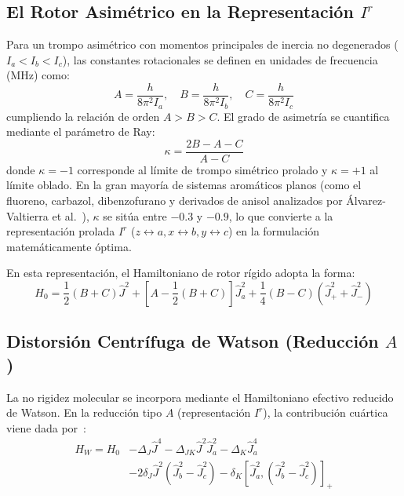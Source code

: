\documentclass[aps,jcp,reprint,twocolumn,superscriptaddress,showpacs,amsmath,amssymb]{revtex4-2}
\begin{document}
\subsection{El Rotor Asim\'etrico en la Representaci\'on $I^r$}
Para un trompo asim\'etrico con momentos principales de inercia no degenerados ($I_a < I_b < I_c$), las constantes rotacionales se definen en unidades de frecuencia (MHz) como:
\begin{equation}
A = \frac{h}{8\pi^2 I_a}, \quad B = \frac{h}{8\pi^2 I_b}, \quad C = \frac{h}{8\pi^2 I_c}
\end{equation}
cumpliendo la relaci\'on de orden $A > B > C$. El grado de asimetr\'ia se cuantifica mediante el par\'ametro de Ray:
\begin{equation}
\kappa = \frac{2B - A - C}{A - C}
\end{equation}
donde $\kappa = -1$ corresponde al l\'imite de trompo sim\'etrico prolado y $\kappa = +1$ al l\'imite oblado. En la gran mayor\'ia de sistemas arom\'aticos planos (como el fluoreno, carbazol, dibenzofurano y derivados de anisol analizados por \'Alvarez-Valtierra et al.~\cite{alvarez2006rotationally,alvarez2010high}), $\kappa$ se sit\'ua entre $-0.3$ y $-0.9$, lo que convierte a la representaci\'on prolada $I^r$ ($z \leftrightarrow a, x \leftrightarrow b, y \leftrightarrow c$) en la formulaci\'on matem\'aticamente \'optima.

En esta representaci\'on, el Hamiltoniano de rotor r\'igido adopta la forma:
\begin{equation}
H_0 = \frac{1}{2}(B + C)\hat{J}^2 + \left[A - \frac{1}{2}(B + C)\right]\hat{J}_a^2 + \frac{1}{4}(B - C)(\hat{J}_+^2 + \hat{J}_-^2)
\end{equation}

\subsection{Distorsi\'on Centr\'ifuga de Watson (Reducci\'on $A$)}
La no rigidez molecular se incorpora mediante el Hamiltoniano efectivo reducido de Watson. En la reducci\'on tipo $A$ (representaci\'on $I^r$), la contribuci\'on cu\'artica viene dada por~\cite{watson1977aspects}:
\begin{align}
H_W = H_0 &- \Delta_J \hat{J}^4 - \Delta_{JK} \hat{J}^2 \hat{J}_a^2 - \Delta_K \hat{J}_a^4 \nonumber \\
&- 2\delta_J \hat{J}^2 (\hat{J}_b^2 - \hat{J}_c^2) - \delta_K [\hat{J}_a^2, (\hat{J}_b^2 - \hat{J}_c^2)]_+
\end{align}
\end{document}
